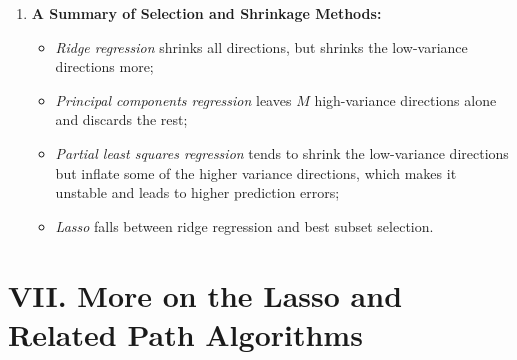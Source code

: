 \documentclass[12pt]{article}
\begin{document}
\begin{enumerate}[label=\textbf{\arabic*.}]
	\item \textbf{A Summary of Selection and Shrinkage Methods:} 
	\begin{itemize}
		\item \textit{Ridge regression} shrinks all directions, but shrinks the low-variance directions more; 
		\item \textit{Principal components regression} leaves $M$ high-variance directions alone and discards the rest; 
		\item \textit{Partial least squares regression} tends to shrink the low-variance directions but inflate some of the higher variance directions, which makes it unstable and leads to higher prediction errors; 
		\item \textit{Lasso} falls between ridge regression and best subset selection.  
	\end{itemize}
	
\end{enumerate}


\section*{VII. More on the Lasso and Related Path Algorithms}
\end{document}
